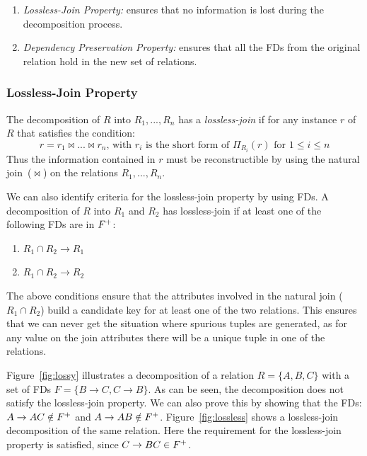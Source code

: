 \begin{enumerate}
  \item \textit{Lossless-Join Property:} ensures that no information is lost during the decomposition process.
  \item \textit{Dependency Preservation Property:} ensures that all the FDs from the original relation hold in the new set of relations. 
\end{enumerate}

\subsubsection{Lossless-Join Property}
The decomposition of $R$ into $R_1,...,R_n$ has a \textit{lossless-join} if for
any instance $r$ of $R$ that satisfies the condition: 
\[
r = r_1 \Join ... \Join r_n \mbox{, with } r_i \mbox{ is the short form of } \Pi_{R_{i}} (r) \mbox{ for } 1 \leq i \leq n
\] 
Thus the information contained in $r$ must be reconstructible by using the natural join~($\Join$) on the relations $R_1,...,R_n$. 

We can also identify criteria for the lossless-join property by using FDs. 
A decomposition of $R$ into $R_1$ and $R_2$ has lossless-join
if at least one of the following FDs are in $F\sp{+}$:
\begin{enumerate}
  \item $R_1 \cap R_2 \rightarrow R_1 $ 
  \item $R_1 \cap R_2 \rightarrow R_2 $
\end{enumerate}

The above conditions ensure that the attributes involved in the natural join 
($R_1 \cap R_2$) build a candidate key for at least one of the two relations. This ensures that 
we can never get the situation where spurious tuples are generated, as for any 
value on the join attributes there will be a unique tuple in one of the relations. 

Figure~\ref{fig:lossy} illustrates a decomposition of a relation $R = \{A, B, C \}$ with
a set of FDs $F = \{B \rightarrow C, C \rightarrow B\}$. As can be seen, the decomposition does
not satisfy the lossless-join property. We can also prove this by showing that the FDs: 
$A \rightarrow AC \notin F\sp{+}$ and $A \rightarrow AB \notin F\sp{+}$.
Figure~\ref{fig:lossless} shows
a lossless-join decomposition of the same relation. Here the requirement for the 
lossless-join property is satisfied,
since $C \rightarrow BC \in F\sp{+}$.


